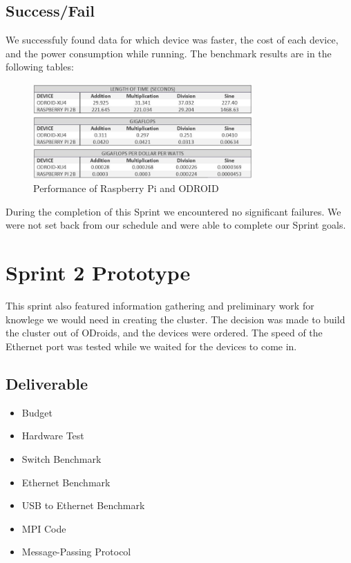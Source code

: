 \subsection{Success/Fail}

We successfuly found data for which device was faster, the cost of each device, and the power consumption while running. The benchmark results are in the following tables:

\begin{figure}[tbh]
	\caption{Performance of Raspberry Pi and ODROID}
	\centering
		\includegraphics[width=0.75\textwidth]{pivsxu4table2.JPG}
\end{figure}

During the completion of this Sprint we encountered no significant failures. We were not set back from our schedule and were able to complete our Sprint goals.

\section{Sprint 2 Prototype}

This sprint also featured information gathering and preliminary work for knowlege we would need in creating the cluster. The decision was made to build the cluster out of ODroids, and the devices were ordered. The speed of the Ethernet port was tested while we waited for the devices to come in.

\subsection{Deliverable}

\begin{itemize}
\item Budget
\item Hardware Test
\item Switch Benchmark
\item Ethernet Benchmark
\item USB to Ethernet Benchmark
\item MPI Code
\item Message-Passing Protocol
\end{itemize}

